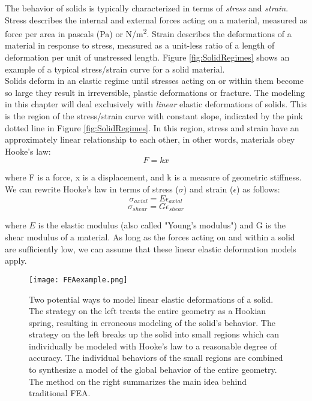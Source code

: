 {The behavior of solids is typically characterized in terms of \textit{stress} and \textit{strain}.  Stress describes the internal and external forces acting on a material, measured as force per area in pascals (Pa) or N/m\textsuperscript{2}.  Strain describes the deformations of a material in response to stress, measured as a unit-less ratio of a length of deformation per unit of unstressed length.  Figure \ref{fig:SolidRegimes} shows an example of a typical stress/strain curve for a solid material.\\

Solids deform in an elastic regime until stresses acting on or within them become so large they result in irreversible, plastic deformations or fracture.  The modeling in this chapter will deal exclusively with \textit{linear} elastic deformations of solids.  This is the region of the stress/strain curve with constant slope, indicated by the pink dotted line in Figure \ref{fig:SolidRegimes}.  In this region, stress and strain have an approximately linear relationship to each other, in other words, materials obey Hooke's law:
\[F = kx\]

where F is a force, x is a displacement, and k is a measure of geometric stiffness.  We can rewrite Hooke's law in terms of stress ($\sigma$) and strain ($\epsilon$) as follows:
\begin{equation}\label{eq:stressstrainaxial}
\sigma_{axial} = E\epsilon_{axial} 
\end{equation}
\begin{equation}\label{eq:stressstrainshear}
\sigma_{shear} = G\epsilon_{shear} 
\end{equation}

where $E$ is the elastic modulus (also called "Young's modulus") and G is the shear modulus of a material.  As long as the forces acting on and within a solid are sufficiently low, we can assume that these linear elastic deformation models apply.\\

\begin{figure}
  \texttt{[image: FEAexample.png]}
  \caption{Two potential ways to model linear elastic deformations of a solid.  The strategy on the left treats the entire geometry as a Hookian spring, resulting in erroneous modeling of the solid's behavior.  The strategy on the left breaks up the solid into small regions which can individually be modeled with Hooke's law to a reasonable degree of accuracy.  The individual behaviors of the small regions are combined to synthesize a model of the global behavior of the entire geometry.  The method on the right summarizes the main idea behind traditional FEA.}
  \label{fig:FEAexample}
\end{figure}

}
